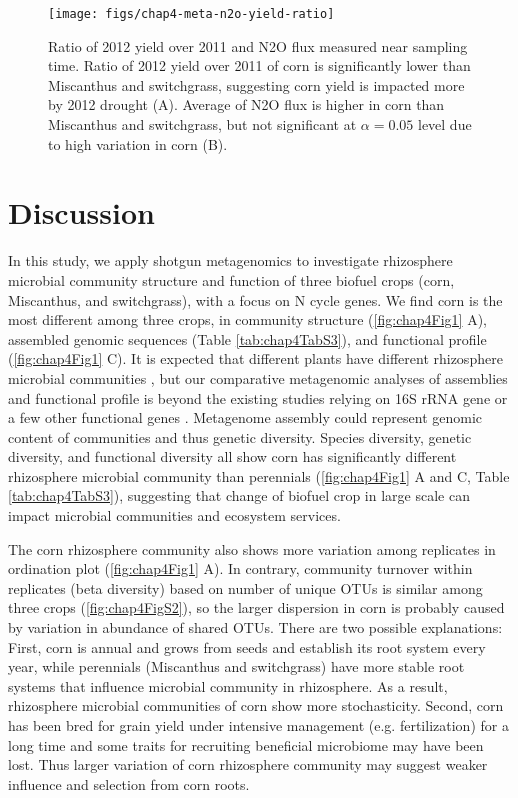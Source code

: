 \documentclass[]{msu-thesis}
\begin{document}
\begin{figure}[tbph!]
  \centering
  \texttt{[image: figs/chap4-meta-n2o-yield-ratio]}
  \caption[Ratio of 2012 yield over 2011 and N2O flux]{Ratio of 2012 yield over 2011 and N2O flux measured near sampling time. Ratio of 2012 yield over 2011 of corn is significantly lower than Miscanthus and switchgrass, suggesting corn yield is impacted more by 2012 drought (A). Average of N2O flux is higher in corn than Miscanthus and switchgrass, but not significant at $\alpha = 0.05$ level due to high variation in corn (B).}
  \label{fig:chap4FigS11}
\end{figure}


\section{Discussion}

In this study, we apply shotgun metagenomics to investigate rhizosphere microbial community structure and function of three biofuel crops (corn, Miscanthus, and switchgrass), with a focus on N cycle genes. We find corn is the most different among three crops, in community structure (\ref{fig:chap4Fig1} A), assembled genomic sequences (Table \ref{tab:chap4TabS3}), and functional profile (\ref{fig:chap4Fig1} C). It is expected that different plants have different rhizosphere microbial communities \cite{smalla_bulk_2001,mao_changes_2011}, but our comparative metagenomic analyses of assemblies and functional profile is beyond the existing studies relying on 16S rRNA gene or a few other functional genes \cite{mao_changes_2011,mao_impact_2013}. Metagenome assembly could represent genomic content of communities and thus genetic diversity. Species diversity, genetic diversity, and functional diversity all show corn has significantly different rhizosphere microbial community than perennials (\cref{fig:chap4Fig1} A and C, Table \ref{tab:chap4TabS3}), suggesting that change of biofuel crop in large scale can impact microbial communities and ecosystem services.

The corn rhizosphere community also shows more variation among replicates in ordination plot (\cref{fig:chap4Fig1} A). In contrary, community turnover within replicates (beta diversity) based on number of unique OTUs is similar among three crops (\cref{fig:chap4FigS2}), so the larger dispersion in corn is probably caused by variation in abundance of shared OTUs. There are two possible explanations: First, corn is annual and grows from seeds and establish its root system every year, while perennials (Miscanthus and switchgrass) have more stable root systems that influence microbial community in rhizosphere. As a result, rhizosphere microbial communities of corn show more stochasticity. Second, corn has been bred for grain yield under intensive management (e.g. fertilization) for a long time and some traits for recruiting beneficial microbiome may have been lost. Thus larger variation of corn rhizosphere community may suggest weaker influence and selection from corn roots.
\end{document}
